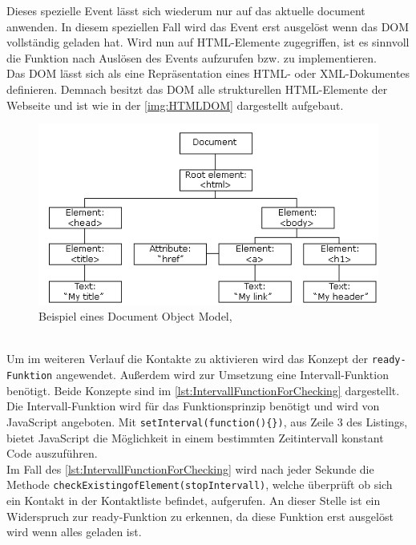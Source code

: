 \documentclass[a4paper,titlepage,halfparskip,12pt]{scrreprt}
\begin{document}
\begin{onehalfspacing}
Dieses spezielle Event lässt sich wiederum nur auf das aktuelle \glqq document\grqq{} anwenden. In diesem speziellen Fall wird das Event erst ausgelöst wenn das \ac{DOM} vollständig geladen hat. Wird nun auf \ac{HTML}-Elemente zugegriffen, ist es sinnvoll die Funktion nach Auslösen des Events aufzurufen bzw. zu implementieren. \cite{w3schoolsJQueryReady}\\
Das \ac{DOM} lässt sich als eine Repräsentation eines HTML- oder XML-Dokumentes definieren. Demnach besitzt das DOM alle strukturellen HTML-Elemente der Webseite und ist wie in der \autoref{img:HTMLDOM} dargestellt aufgebaut.\cite{w3schoolsDOM}
\begin{figure}[h]
	\centering
	\includegraphics[scale=1.2]{images/HTMLDOM}
	\caption{Beispiel eines Document Object Model, \cite{w3schoolsDOM}}
	\label{img:HTMLDOM}
\end{figure}\\
Um im weiteren Verlauf die Kontakte zu aktivieren wird das Konzept der \texttt{ready-Funktion} angewendet. Außerdem wird zur Umsetzung eine Intervall-Funktion benötigt. Beide Konzepte sind im \autoref{lst:IntervallFunctionForChecking} dargestellt. Die Intervall-Funktion wird für das Funktionsprinzip benötigt und wird von JavaScript angeboten. Mit \texttt{setInterval(function()\{\})}, aus Zeile 3 des Listings, bietet JavaScript die Möglichkeit in einem bestimmten Zeitintervall konstant Code auszuführen. \cite{w3schoolssetInterval}\\
Im Fall des \autoref{lst:IntervallFunctionForChecking} wird nach jeder Sekunde die Methode \texttt{checkExistingofElement(stopIntervall)}, welche überprüft ob sich ein Kontakt in der Kontaktliste befindet, aufgerufen. An dieser Stelle ist ein Widerspruch zur ready-Funktion zu erkennen, da diese Funktion erst ausgelöst wird wenn alles geladen ist. 
\begin{lstlisting}[language=Javascript,caption= Ready() Funktion mit der Intervall-Funktion zur Überprüfung der Kontaktliste,label={lst:IntervallFunctionForChecking}]

\end{lstlisting}
\end{onehalfspacing}
\end{document}
